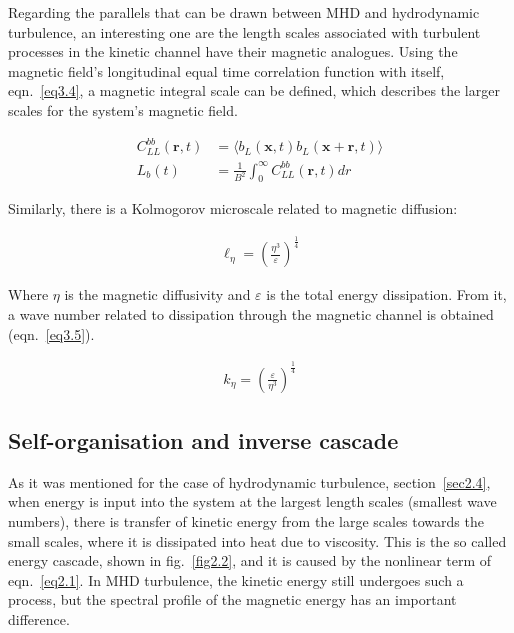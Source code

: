 \documentclass[12pt,a4paper]{report}
\begin{document}
Regarding the parallels that can be drawn between MHD and hydrodynamic turbulence, an interesting one are the length scales associated with turbulent processes in the kinetic channel have their magnetic analogues. Using the magnetic field's longitudinal equal time correlation function with itself, eqn.~\ref{eq3.4}, a magnetic integral scale can be defined, which describes the larger scales for the system's magnetic field.

\begin{align}
 C_{LL}^{bb}(\bm r, t) &= \langle b_L(\bm x, t) b_L(\bm x + \bm r, t) \rangle \label{eq3.4} \\
 L_b(t) &= \frac{1}{B^2} \int_0^\infty C_{LL}^{bb}(\bm r, t) dr \nonumber
\end{align}

Similarly, there is a Kolmogorov microscale related to magnetic diffusion:

\begin{align}
 \ell_\eta = \left( \frac{\eta^3}{\varepsilon} \right)^{\frac{1}{4}} \nonumber
\end{align}

Where $\eta$ is the magnetic diffusivity and $\varepsilon$ is the total energy dissipation. From it, a wave number related to dissipation through the magnetic channel is obtained (eqn.~\ref{eq3.5}).

\begin{align}
 k_\eta = \left( \frac{\varepsilon}{\eta^3} \right)^{\frac{1}{4}} \label{eq3.5}
\end{align}

\subsection{Self-organisation and inverse cascade}

As it was mentioned for the case of hydrodynamic turbulence, section~\ref{sec2.4}, when energy is input into the system at the largest length scales (smallest wave numbers), there is transfer of kinetic energy from the large scales towards the small scales, where it is dissipated into heat due to viscosity. This is the so called energy cascade, shown in fig.~\ref{fig2.2}, and it is caused by the nonlinear term of eqn.~\ref{eq2.1}. In MHD turbulence, the kinetic energy still undergoes such a process, but the spectral profile of the magnetic energy has an important difference. 
\end{document}
